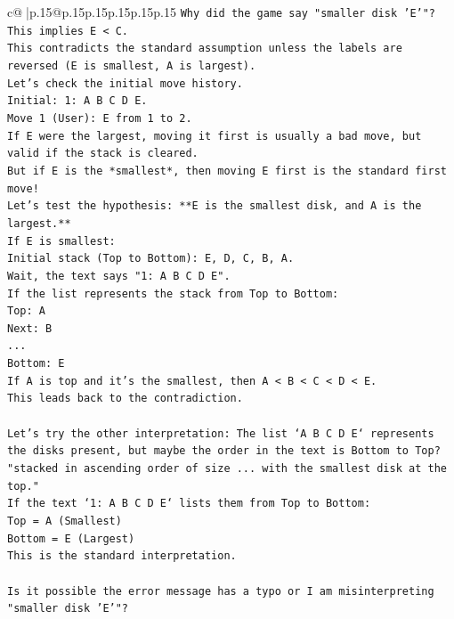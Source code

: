 \documentclass{article}
\begin{document}
{\begin{supertabular}{c@{$\;$}|p{.15\linewidth}@{}p{.15\linewidth}p{.15\linewidth}p{.15\linewidth}p{.15\linewidth}p{.15\linewidth}}
{{{\texttt{Why did the game say "smaller disk 'E'"?} \\
\texttt{This implies E < C.} \\
\texttt{This contradicts the standard assumption unless the labels are reversed (E is smallest, A is largest).} \\
\texttt{Let's check the initial move history.} \\
\texttt{Initial: 1: A B C D E.} \\
\texttt{Move 1 (User): E from 1 to 2.} \\
\texttt{If E were the largest, moving it first is usually a bad move, but valid if the stack is cleared.} \\
\texttt{But if E is the *smallest*, then moving E first is the standard first move!} \\
\texttt{Let's test the hypothesis: **E is the smallest disk, and A is the largest.**} \\
\texttt{If E is smallest:} \\
\texttt{Initial stack (Top to Bottom): E, D, C, B, A.} \\
\texttt{Wait, the text says "1: A B C D E".} \\
\texttt{If the list represents the stack from Top to Bottom:} \\
\texttt{Top: A} \\
\texttt{Next: B} \\
\texttt{...} \\
\texttt{Bottom: E} \\
\texttt{If A is top and it's the smallest, then A < B < C < D < E.} \\
\texttt{This leads back to the contradiction.} \\
\\ 
\texttt{Let's try the other interpretation: The list `A B C D E` represents the disks present, but maybe the order in the text is Bottom to Top?} \\
\texttt{"stacked in ascending order of size ... with the smallest disk at the top."} \\
\texttt{If the text `1: A B C D E` lists them from Top to Bottom:} \\
\texttt{Top = A (Smallest)} \\
\texttt{Bottom = E (Largest)} \\
\texttt{This is the standard interpretation.} \\
\\ 
\texttt{Is it possible the error message has a typo or I am misinterpreting "smaller disk 'E'"?} \\
}}}
\end{supertabular}}
\end{document}
